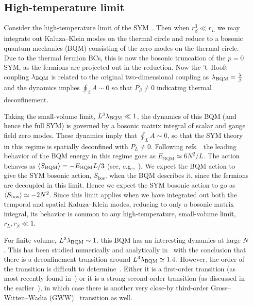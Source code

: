 \subsection{\label{sec:rectHighTemp}High-temperature limit}
Consider the high-temperature limit of the SYM~\cite{Aharony:2004ig, Aharony:2005ew}.
Then when $r_{\beta}^3 \ll r_L$ we may integrate out Kaluza--Klein modes on the thermal circle and reduce to a bosonic quantum mechanics (BQM) consisting of the zero modes on the thermal circle.
Due to the thermal fermion BCs, this is now the bosonic truncation of the $p = 0$ SYM, as the fermions are projected out in the reduction.
Now the 't~Hooft coupling $\lambda_{\text{BQM}}$ is related to the original two-dimensional coupling as $\lambda_{\text{BQM}} = \frac{\lambda}{\beta}$ and the dynamics implies $\oint_{\beta} A \sim 0$ so that $P_{\beta} \ne 0$ indicating thermal deconfinement.

Taking the small-volume limit, $L^3 \lambda_{\text{BQM}} \ll 1$, the dynamics of this BQM (and hence the full SYM) is governed by a bosonic matrix integral of scalar and gauge field zero modes.
These dynamics imply that $\oint_L A \sim 0$, so that the SYM theory in this regime is spatially deconfined with $P_L \ne 0$.
Following refs.~\cite{Hotta:1998en, Kawahara:2007ib} the leading behavior of the BQM energy in this regime goes as $E_{\text{BQM}} \simeq 6N^2 / L$.
The action behaves as $\left\langle S_{\text{BQM}} \right\rangle = -E_{\text{BQM}} L / 3$ (see, e.g.,~\cite{Catterall:2007fp}).
We expect the BQM action to give the SYM bosonic action, $S_{\text{bos}}$, when the BQM describes it, since the fermions are decoupled in this limit.
Hence we expect the SYM bosonic action to go as $\left\langle S_{\text{bos}} \right\rangle \simeq -2N^2$.
Since this limit applies when we have integrated out both the temporal and spatial Kaluza--Klein modes, reducing to only a bosonic matrix integral, its behavior is common to any high-temperature, small-volume limit, $r_L, r_{\beta} \ll 1$.

For finite volume, $L^3 \lambda_{\text{BQM}} \sim 1$, this BQM has an interesting dynamics at large $N$.
This has been studied numerically and analytically in~\cite{Aharony:2004ig, Kawahara:2007fn, Mandal:2009vz, Azuma:2014cfa} with the conclusion that there is a deconfinement transition around $L^3 \lambda_{\text{BQM}} \simeq 1.4$.
However, the order of the transition is difficult to determine~\cite{Aharony:2004ig}.
Either it is a first-order transition (as most recently found in~\cite{Azuma:2014cfa}) or it is a strong second-order transition (as discussed in the earlier~\cite{Kawahara:2007fn, Mandal:2009vz}), in which case there is another very close-by third-order Gross--Witten--Wadia (GWW)~\cite{Gross:1980he, Wadia:1980cp} transition as well.

